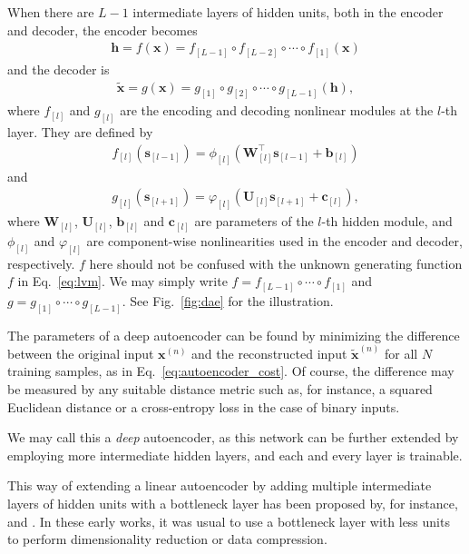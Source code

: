 \documentclass{now}
\newcommand{\qlay}[1]{\left[#1\right]}
\newcommand{\vect}[1]{\mathbf{#1}}
\newcommand{\matr}[1]{\mathbf{#1}}
\newcommand{\vb}[0]{\vect{b}}
\newcommand{\vc}[0]{\vect{c}}
\newcommand{\vh}[0]{\vect{h}}
\newcommand{\vx}[0]{\vect{x}}
\newcommand{\vs}[0]{\vect{s}}
\newcommand{\mW}[0]{\matr{W}}
\newcommand{\mU}[0]{\matr{U}}
\begin{document}
When there are $L-1$ intermediate layers of hidden units,
both in the encoder and decoder, the encoder becomes
\begin{align}
    \label{eq:ae_encoder}
    \vh = f(\vx) = f_{
    \qlay{L-1}} \circ f_{\qlay{L-2}} \circ \cdots \circ
    f_{\qlay{1}}(\vx)
\end{align}
and the decoder is
\begin{align}
    \label{eq:ae_decoder}
    \tilde{\vx} = g(\vx) = g_{\qlay{1}} \circ g_{\qlay{2}} \circ \cdots \circ
    g_{\qlay{L-1}} (\vh),
\end{align}
where $f_{\qlay{l}}$ and $g_{\qlay{l}}$ are the encoding and decoding
nonlinear modules at the $l$-th layer. They are
defined by
\begin{align*}
    f_{\qlay{l}}(\vs_{\qlay{l-1}}) = \phi_{\qlay{l}}
    \left(\mW_{\qlay{l}}^\top \vs_{\qlay{l-1}} +
    \vb_{\qlay{l}}\right)
\end{align*}
and
\begin{align*}
    g_{\qlay{l}}(\vs_{\qlay{l+1}}) = \varphi_{\qlay{l}}
    \left(\mU_{\qlay{l}} \vs_{\qlay{l+1}} + \vc_{\qlay{l}}
    \right),
\end{align*}
where $\mW_{\qlay{l}}$, $\mU_{\qlay{l}}$, $\vb_{\qlay{l}}$
and $\vc_{\qlay{l}}$ are parameters
of the $l$-th hidden module, and $\phi_{\qlay{l}}$ and
$\varphi_{\qlay{l}}$
are component-wise nonlinearities used in the encoder and
decoder, respectively.  $f$ here should not be confused with
the unknown generating function $f$ in Eq.~\eqref{eq:lvm}.
We may simply write $f = f_{\qlay{L-1}} \circ \cdots \circ
f_{\qlay{1}}$ and
$g = g_{\qlay{1}} \circ \cdots \circ g_{\qlay{L-1}}$. See Fig.~\ref{fig:dae}
for the illustration.

The parameters of a deep autoencoder can be found by
minimizing the difference between the original input
$\vx^{(n)}$ and the reconstructed input $\tilde{\vx}^{(n)}$
for all $N$ training samples, as in
Eq.~\eqref{eq:autoencoder_cost}. Of course, the difference
may be measured by any suitable distance metric such as, for
instance, a squared Euclidean distance or a cross-entropy
loss in the case of binary inputs.

We may call this a \textit{deep} autoencoder, as 
this network can be further extended by employing
more intermediate hidden layers, and each and every layer is
trainable.

This way of extending a linear autoencoder by adding
multiple intermediate layers of hidden units with a
bottleneck layer has been proposed by, for instance,
\citet{Oja1991} and \citet{Kramer1991}. In these early
works, it was usual to use a bottleneck layer with less
units to perform 
dimensionality reduction or data compression.
\end{document}
